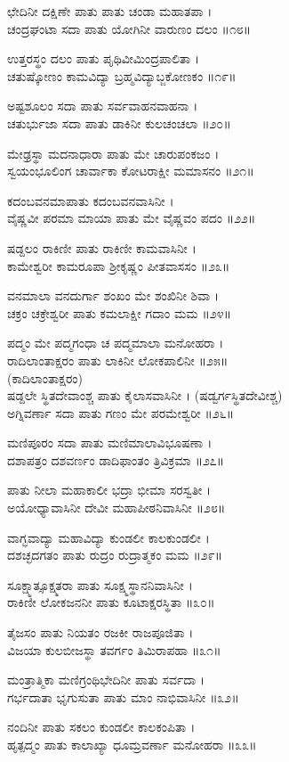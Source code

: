 ಛೇದಿನೀ ದಕ್ಷಿಣೇ ಪಾತು ಪಾತು ಚಂಡಾ ಮಹಾತಪಾ ।\\
ಚಂದ್ರಘಂಟಾ ಸದಾ ಪಾತು ಯೋಗಿನೀ ವಾರುಣಂ ದಲಂ ॥೧೮॥

ಉತ್ತರಸ್ಥಂ ದಲಂ ಪಾತು ಪೃಥಿವೀಮಿಂದ್ರಪಾಲಿತಾ ।\\
ಚತುಷ್ಕೋಣಂ ಕಾಮವಿದ್ಯಾ ಬ್ರಹ್ಮವಿದ್ಯಾಬ್ಜಕೋಣಕಂ ॥೧೯॥

ಅಷ್ಟಶೂಲಂ ಸದಾ ಪಾತು ಸರ್ವವಾಹನವಾಹನಾ ।\\
ಚತುರ್ಭುಜಾ ಸದಾ ಪಾತು ಡಾಕಿನೀ ಕುಲಚಂಚಲಾ ॥೨೦॥

ಮೇಢ್ರಸ್ಥಾ ಮದನಾಧಾರಾ ಪಾತು ಮೇ ಚಾರುಪಂಕಜಂ ।\\
ಸ್ವಯಂಭೂಲಿಂಗ ಚಾರ್ವಾಕಾ ಕೋಟರಾಕ್ಷೀ ಮಮಾಸನಂ ॥೨೧॥

ಕದಂಬವನಮಾಪಾತು ಕದಂಬವನವಾಸಿನೀ ।\\
ವೈಷ್ಣವೀ ಪರಮಾ ಮಾಯಾ ಪಾತು ಮೇ ವೈಷ್ಣವಂ ಪದಂ ॥೨೨॥

ಷಡ್ದಲಂ ರಾಕಿಣೀ ಪಾತು ರಾಕಿಣೀ ಕಾಮವಾಸಿನೀ ।\\
ಕಾಮೇಶ್ವರೀ ಕಾಮರೂಪಾ ಶ್ರೀಕೃಷ್ಣಂ ಪೀತವಾಸಸಂ ॥೨೩॥

ವನಮಾಲಾ ವನದುರ್ಗಾ ಶಂಖಂ ಮೇ ಶಂಖಿನೀ ಶಿವಾ ।\\
ಚಕ್ರಂ ಚಕ್ರೇಶ್ವರೀ ಪಾತು ಕಮಲಾಕ್ಷೀ ಗದಾಂ ಮಮ ॥೨೪॥

ಪದ್ಮಂ ಮೇ ಪದ್ಮಗಂಧಾ ಚ ಪದ್ಮಮಾಲಾ ಮನೋಹರಾ ।\\
ರಾದಿಲಾಂತಾಕ್ಷರಂ ಪಾತು ಲಾಕಿನೀ ಲೋಕಪಾಲಿನೀ ॥೨೫॥\\(ಕಾದಿಲಾಂತಾಕ್ಷರಂ)\\
ಷಡ್ದಲೇ ಸ್ಥಿತದೇವಾಂಶ್ಚ ಪಾತು ಕೈಲಾಸವಾಸಿನೀ । (ಷಡ್ವರ್ಗಸ್ಥಿತದೇವೀಶ್ಚ)\\
ಅಗ್ನಿವರ್ಣಾ ಸದಾ ಪಾತು ಗಣಂ ಮೇ ಪರಮೇಶ್ವರೀ ॥೨೬॥

ಮಣಿಪೂರಂ ಸದಾ ಪಾತು ಮಣಿಮಾಲಾವಿಭೂಷಣಾ ।\\
ದಶಾಪತ್ರಂ ದಶವರ್ಣಂ ಡಾದಿಫಾಂತಂ ತ್ರಿವಿಕ್ರಮಾ ॥೨೭॥

ಪಾತು ನೀಲಾ ಮಹಾಕಾಲೀ ಭದ್ರಾ ಭೀಮಾ ಸರಸ್ವತೀ ।\\
ಅಯೋಧ್ಯಾವಾಸಿನೀ ದೇವೀ ಮಹಾಪೀಠನಿವಾಸಿನೀ ॥೨೮॥

ವಾಗ್ಭವಾದ್ಯಾ ಮಹಾವಿದ್ಯಾ ಕುಂಡಲೀ ಕಾಲಕುಂಡಲೀ ।\\
ದಶಚ್ಛದಗತಂ ಪಾತು ರುದ್ರಂ ರುದ್ರಾತ್ಮಕಂ ಮಮ ॥೨೯॥

ಸೂಕ್ಷ್ಮಾತ್ಸೂಕ್ಷ್ಮತರಾ ಪಾತು ಸೂಕ್ಷ್ಮಸ್ಥಾನನಿವಾಸಿನೀ ।\\
ರಾಕಿಣೀ ಲೋಕಜನನೀ ಪಾತು ಕೂಟಾಕ್ಷರಸ್ಥಿತಾ ॥೩೦॥

ತೈಜಸಂ ಪಾತು ನಿಯತಂ ರಜಕೀ ರಾಜಪೂಜಿತಾ ।\\
ವಿಜಯಾ ಕುಲಬೀಜಸ್ಥಾ ತವರ್ಗಂ ತಿಮಿರಾಪಹಾ ॥೩೧॥

ಮಂತ್ರಾತ್ಮಿಕಾ ಮಣಿಗ್ರಂಥಿಭೇದಿನೀ ಪಾತು ಸರ್ವದಾ ।\\
ಗರ್ಭದಾತಾ ಭೃಗುಸುತಾ ಪಾತು ಮಾಂ ನಾಭಿವಾಸಿನೀ ॥೩೨॥

ನಂದಿನೀ ಪಾತು ಸಕಲಂ ಕುಂಡಲೀ ಕಾಲಕಂಪಿತಾ ।\\
ಹೃತ್ಪದ್ಮಂ ಪಾತು ಕಾಲಾಖ್ಯಾ ಧೂಮ್ರವರ್ಣಾ ಮನೋಹರಾ ॥೩೩॥

